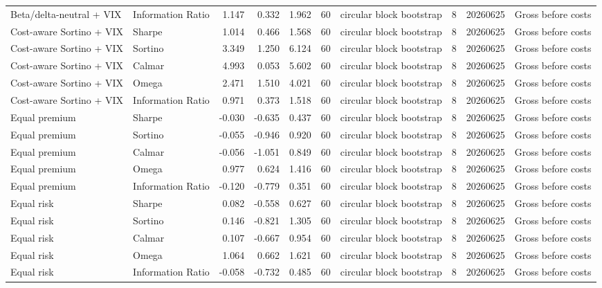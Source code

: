 \begin{tabular}{llrrrrlrrl}
Beta/delta-neutral + VIX & Information Ratio & 1.147 & 0.332 & 1.962 & 60 & circular block bootstrap & 8 & 20260625 & Gross before costs \\
Cost-aware Sortino + VIX & Sharpe & 1.014 & 0.466 & 1.568 & 60 & circular block bootstrap & 8 & 20260625 & Gross before costs \\
Cost-aware Sortino + VIX & Sortino & 3.349 & 1.250 & 6.124 & 60 & circular block bootstrap & 8 & 20260625 & Gross before costs \\
Cost-aware Sortino + VIX & Calmar & 4.993 & 0.053 & 5.602 & 60 & circular block bootstrap & 8 & 20260625 & Gross before costs \\
Cost-aware Sortino + VIX & Omega & 2.471 & 1.510 & 4.021 & 60 & circular block bootstrap & 8 & 20260625 & Gross before costs \\
Cost-aware Sortino + VIX & Information Ratio & 0.971 & 0.373 & 1.518 & 60 & circular block bootstrap & 8 & 20260625 & Gross before costs \\
Equal premium & Sharpe & -0.030 & -0.635 & 0.437 & 60 & circular block bootstrap & 8 & 20260625 & Gross before costs \\
Equal premium & Sortino & -0.055 & -0.946 & 0.920 & 60 & circular block bootstrap & 8 & 20260625 & Gross before costs \\
Equal premium & Calmar & -0.056 & -1.051 & 0.849 & 60 & circular block bootstrap & 8 & 20260625 & Gross before costs \\
Equal premium & Omega & 0.977 & 0.624 & 1.416 & 60 & circular block bootstrap & 8 & 20260625 & Gross before costs \\
Equal premium & Information Ratio & -0.120 & -0.779 & 0.351 & 60 & circular block bootstrap & 8 & 20260625 & Gross before costs \\
Equal risk & Sharpe & 0.082 & -0.558 & 0.627 & 60 & circular block bootstrap & 8 & 20260625 & Gross before costs \\
Equal risk & Sortino & 0.146 & -0.821 & 1.305 & 60 & circular block bootstrap & 8 & 20260625 & Gross before costs \\
Equal risk & Calmar & 0.107 & -0.667 & 0.954 & 60 & circular block bootstrap & 8 & 20260625 & Gross before costs \\
Equal risk & Omega & 1.064 & 0.662 & 1.621 & 60 & circular block bootstrap & 8 & 20260625 & Gross before costs \\
Equal risk & Information Ratio & -0.058 & -0.732 & 0.485 & 60 & circular block bootstrap & 8 & 20260625 & Gross before costs \\

\end{tabular}
